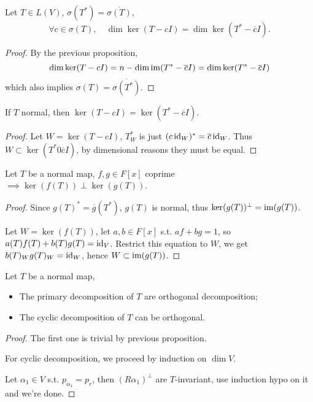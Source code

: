\begin{proposition}
	Let $T\in L(V)$, $\sigma(T^*) = \overline{\sigma(T)}$,
	\[
		\forall c\in \sigma(T), \quad
		\dim\ker(T - cI) = \dim\ker(T^* - \overline{c}I).
	\]
\end{proposition}
\begin{proof}[Proof]
    By the previous proposition,
	\[
	\dim \ker(T - cI) = n - \dim\operatorname{im}(T^* - \overline{c}I)
	= \dim\ker(T^* - \overline{c}I)
	\]
	which also implies $\sigma(T) = \overline{\sigma(T^*)}$.
\end{proof}
\begin{proposition}
	If $T$ normal, then $\ker(T - cI) = \ker(T^* - \overline{c}I)$.
\end{proposition}
\begin{proof}[Proof]
    Let $W = \ker(T - cI)$, $T_W^*$ is just $(c\operatorname{id}_W)^* = \overline{c}\operatorname{id}_W$.
	Thus $W \subset \ker(T^* 0 \overline{c}I)$, by dimensional reasons they
	must be equal.
\end{proof}

\begin{proposition}
	Let $T$ be a normal map, $f, g\in F[x]$ coprime
	$\implies \ker(f(T))\perp \ker(g(T))$.
\end{proposition}
\begin{proof}[Proof]
    Since $g(T)^* = \overline{g}(T^*)$, $g(T)$ is normal,
	thus $\ker(g(T))^\perp = \operatorname{im}(g(T))$.

	Let $W = \ker(f(T))$, let $a, b\in F[x]$ s.t. $af+bg = 1$,
	so $a(T)f(T) + b(T)g(T) = \operatorname{id}_V$.
	Restrict this equation to $W$, we get $b(T)_W g(T)_W = \operatorname{id}_W$,
	hence  $W \subset \operatorname{im}(g(T))$.
\end{proof}

\begin{proposition}
	Let $T$ be a normal map,
	\begin{itemize}
		\item The primary decomposition of $T$ are orthogonal decomposition;
		\item The cyclic decomposition of $T$ can be orthogonal.
	\end{itemize}
\end{proposition}
\begin{proof}[Proof]
    The first one is trivial by previous proposition.

	For cyclic decomposition, we proceed by induction on $\dim V$.

	Let $\alpha_1\in V$ s.t. $p_{\alpha_1} = p_r$,
	then $(R\alpha_1)^\perp$ are $T$-invariant, use induction hypo
	on it and we're done.
\end{proof}

